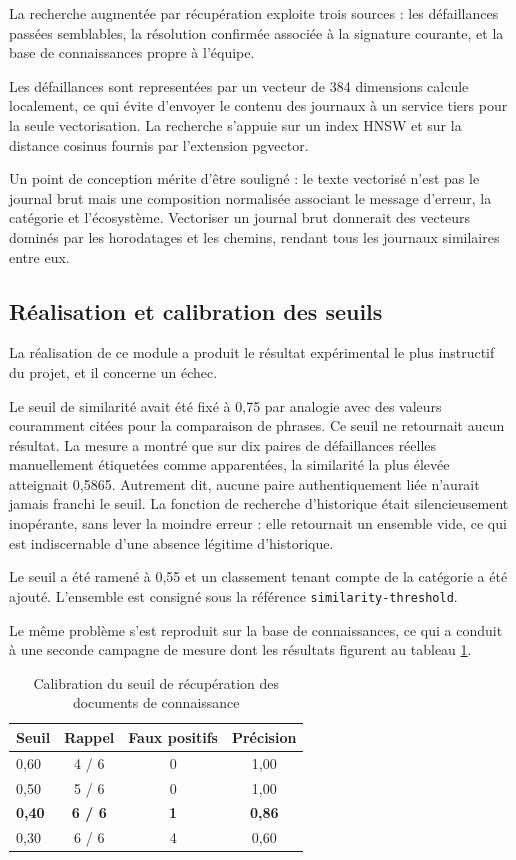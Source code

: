 \documentclass[12pt,a4paper,oneside]{report}
\begin{document}
La recherche augmentée par récupération exploite trois sources : les défaillances
passées semblables, la résolution confirmée associée à la signature courante, et
la base de connaissances propre à l'équipe.

Les défaillances sont representées par un vecteur de 384 dimensions calcule
localement, ce qui évite d'envoyer le contenu des journaux à un service tiers
pour la seule vectorisation. La recherche s'appuie sur un index HNSW et sur la
distance cosinus fournis par l'extension pgvector.

Un point de conception mérite d'être souligné : le texte vectorisé n'est pas le
journal brut mais une composition normalisée associant le message d'erreur, la
catégorie et l'écosystème. Vectoriser un journal brut donnerait des vecteurs
dominés par les horodatages et les chemins, rendant tous les journaux similaires
entre eux.

\subsection{Réalisation et calibration des seuils}

La réalisation de ce module a produit le résultat expérimental le plus
instructif du projet, et il concerne un échec.

Le seuil de similarité avait été fixé à 0,75 par analogie avec des valeurs
couramment citées pour la comparaison de phrases. Ce seuil ne retournait aucun
résultat. La mesure a montré que sur dix paires de défaillances réelles
manuellement étiquetées comme apparentées, la similarité la plus élevée
atteignait 0,5865. Autrement dit, aucune paire authentiquement liée n'aurait
jamais franchi le seuil. La fonction de recherche d'historique était
silencieusement inopérante, sans lever la moindre erreur : elle retournait un
ensemble vide, ce qui est indiscernable d'une absence légitime d'historique.

Le seuil a été ramené à 0,55 et un classement tenant compte de la catégorie a été
ajouté. L'ensemble est consigné sous la référence \texttt{similarity-threshold}.

Le même problème s'est reproduit sur la base de connaissances, ce qui a conduit à
une seconde campagne de mesure dont les résultats figurent au tableau
\ref{tab:seuils}.

\begin{table}[htbp]
\centering
\caption{Calibration du seuil de récupération des documents de connaissance}
\label{tab:seuils}
\small
\begin{tabular}{@{}lccc@{}}
\toprule
\textbf{Seuil} & \textbf{Rappel} & \textbf{Faux positifs} & \textbf{Précision} \\
\midrule
0,60 & 4 / 6 & 0 & 1,00 \\
0,50 & 5 / 6 & 0 & 1,00 \\
\textbf{0,40} & \textbf{6 / 6} & \textbf{1} & \textbf{0,86} \\
0,30 & 6 / 6 & 4 & 0,60 \\
\bottomrule
\end{tabular}
\end{table}
\end{document}
